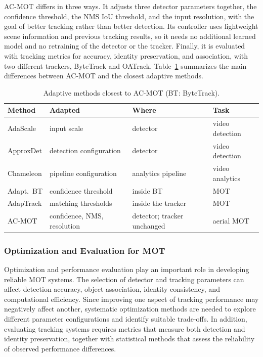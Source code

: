 \documentclass[journal]{new-aiaa}
\begin{document}
AC-MOT differs in three ways. It adjusts three detector parameters together, the confidence threshold, the NMS IoU threshold, and the input resolution, with the goal of better tracking rather than better detection. Its controller uses lightweight scene information and previous tracking results, so it needs no additional learned model and no retraining of the detector or the tracker. Finally, it is evaluated with tracking metrics for accuracy, identity preservation, and association, with two different trackers, ByteTrack and OATrack. Table~\ref{tab:related} summarizes the main differences between AC-MOT and the closest adaptive methods.

\begin{table}[htbp]
\caption{Adaptive methods closest to AC-MOT (BT: ByteTrack).}
\label{tab:related}
\centering\footnotesize
\setlength{\tabcolsep}{3pt}
\begin{tabular}{@{}l>{\raggedright\arraybackslash}p{20mm}>{\raggedright\arraybackslash}p{17mm}>{\raggedright\arraybackslash}p{13mm}@{}}
\toprule
Method & Adapted & Where & Task\\
\midrule
AdaScale \cite{chin2019adascale} & input scale & detector & video detection\\
ApproxDet \cite{xu2020approxdet} & detection configuration & detector & video detection\\
Chameleon \cite{jiang2018chameleon} & pipeline configuration & analytics pipeline & video analytics\\
Adapt.\ BT \cite{ma2023adaptivebytetrack} & confidence threshold & inside BT & MOT\\
AdapTrack \cite{shim2024adaptrack} & matching thresholds & inside the tracker & MOT\\
AC-MOT & confidence, NMS, resolution & detector; tracker unchanged & aerial MOT\\
\bottomrule
\end{tabular}
\end{table}

\subsubsection{Optimization and Evaluation for MOT}
Optimization and performance evaluation play an important role in developing reliable MOT systems. The selection of detector and tracking parameters can affect detection accuracy, object association, identity consistency, and computational efficiency. Since improving one aspect of tracking performance may negatively affect another, systematic optimization methods are needed to explore different parameter configurations and identify suitable trade-offs. In addition, evaluating tracking systems requires metrics that measure both detection and identity preservation, together with statistical methods that assess the reliability of observed performance differences.
\end{document}

